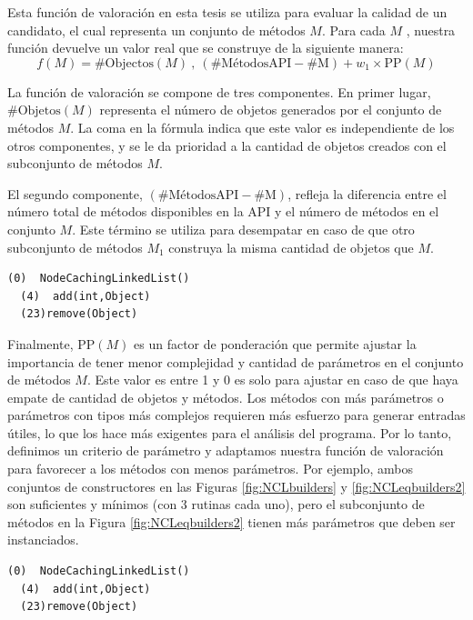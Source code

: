 Esta función de valoración en esta tesis se utiliza para evaluar la calidad de un candidato, el cual representa un conjunto de métodos $M$. Para cada $M$ , nuestra función devuelve un valor real que se construye de la siguiente manera:
{\small
\[
f(M) = \text{{\#Objectos}}(M) \ , \ (\text{{\#MétodosAPI}} - \text{{\#M}}) + w_1 \times \text{{PP}}(M)
\]
}

La función de valoración se compone de tres componentes. En primer lugar, $\text{{\#Objetos}}(M)$ representa el número de objetos generados por el conjunto de métodos $M$. La coma en la fórmula indica que este valor es independiente de los otros componentes, y se le da prioridad a la cantidad de objetos creados con el subconjunto de métodos $M$.

El segundo componente, $(\text{{\#MétodosAPI}} - \text{{\#M}})$, refleja la diferencia entre el número total de métodos disponibles en la API y el número de métodos en el conjunto $M$. Este término se utiliza para desempatar en caso de que otro subconjunto de métodos $M_1$ construya la misma cantidad de objetos que $M$.

\begin{lstlisting}[label=fig:NCLeqbuilders2, caption=Sufficient and minimal builders for NCL with more complex parameters than the ones in Figure \ref{fig:NCLbuilders}, captionpos=b, frame=tb, float=t]
  (0)  NodeCachingLinkedList()
  (4)  add(int,Object)
  (23)remove(Object)
\end{lstlisting}

Finalmente, $\text{{PP}}(M)$ es un factor de ponderación que permite ajustar la importancia de tener menor complejidad y cantidad de parámetros en el conjunto de métodos $M$. Este valor es entre 1 y 0 es solo para ajustar en caso de que haya empate de cantidad de objetos y métodos.
Los métodos con más parámetros o parámetros con tipos más complejos requieren más esfuerzo para generar entradas útiles, lo que los hace más exigentes para el análisis del programa. Por lo tanto, definimos un criterio de parámetro y adaptamos nuestra función de valoración para favorecer a los métodos con menos parámetros. Por ejemplo, ambos conjuntos de constructores en las Figuras \ref{fig:NCLbuilders} y \ref{fig:NCLeqbuilders2} son suficientes y mínimos (con 3 rutinas cada uno), pero el subconjunto de métodos en la Figura \ref{fig:NCLeqbuilders2} tienen más parámetros que deben ser instanciados. 

\begin{lstlisting}[label=fig:NCLeqbuilders2, caption=Sufficient and minimal builders for NCL with more complex parameters than the ones in Figure \ref{fig:NCLbuilders}, captionpos=b, frame=tb, float=t]
  (0)  NodeCachingLinkedList()
  (4)  add(int,Object)
  (23)remove(Object)
\end{lstlisting}

